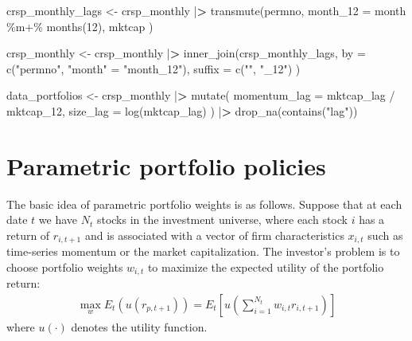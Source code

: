 \documentclass[
]{krantz}
\newenvironment{Shaded}{\begin{snugshade}}{\end{snugshade}}
\newcommand{\AttributeTok}[1]{\textcolor[rgb]{0.61,0.61,0.61}{#1}}
\newcommand{\DecValTok}[1]{\textcolor[rgb]{0.06,0.06,0.06}{#1}}
\newcommand{\ErrorTok}[1]{\textcolor[rgb]{0.14,0.14,0.14}{\textbf{#1}}}
\newcommand{\FunctionTok}[1]{\textcolor[rgb]{0,0,0}{#1}}
\newcommand{\NormalTok}[1]{#1}
\newcommand{\OtherTok}[1]{\textcolor[rgb]{0.37,0.37,0.37}{#1}}
\newcommand{\SpecialCharTok}[1]{\textcolor[rgb]{0,0,0}{#1}}
\newcommand{\StringTok}[1]{\textcolor[rgb]{0.5,0.5,0.5}{#1}}
\begin{document}
\begin{Shaded}
\begin{Highlighting}[]
\NormalTok{crsp\_monthly\_lags }\OtherTok{\textless{}{-}}\NormalTok{ crsp\_monthly }\SpecialCharTok{|}\ErrorTok{\textgreater{}}
  \FunctionTok{transmute}\NormalTok{(permno,}
    \AttributeTok{month\_12 =}\NormalTok{ month }\SpecialCharTok{\%m+\%} \FunctionTok{months}\NormalTok{(}\DecValTok{12}\NormalTok{),}
\NormalTok{    mktcap}
\NormalTok{  )}

\NormalTok{crsp\_monthly }\OtherTok{\textless{}{-}}\NormalTok{ crsp\_monthly }\SpecialCharTok{|}\ErrorTok{\textgreater{}}
  \FunctionTok{inner\_join}\NormalTok{(crsp\_monthly\_lags,}
    \AttributeTok{by =} \FunctionTok{c}\NormalTok{(}\StringTok{"permno"}\NormalTok{, }\StringTok{"month"} \OtherTok{=} \StringTok{"month\_12"}\NormalTok{),}
    \AttributeTok{suffix =} \FunctionTok{c}\NormalTok{(}\StringTok{""}\NormalTok{, }\StringTok{"\_12"}\NormalTok{)}
\NormalTok{  )}

\NormalTok{data\_portfolios }\OtherTok{\textless{}{-}}\NormalTok{ crsp\_monthly }\SpecialCharTok{|}\ErrorTok{\textgreater{}}
  \FunctionTok{mutate}\NormalTok{(}
    \AttributeTok{momentum\_lag =}\NormalTok{ mktcap\_lag }\SpecialCharTok{/}\NormalTok{ mktcap\_12,}
    \AttributeTok{size\_lag =} \FunctionTok{log}\NormalTok{(mktcap\_lag)}
\NormalTok{  ) }\SpecialCharTok{|}\ErrorTok{\textgreater{}}
  \FunctionTok{drop\_na}\NormalTok{(}\FunctionTok{contains}\NormalTok{(}\StringTok{"lag"}\NormalTok{))}
\end{Highlighting}
\end{Shaded}

\hypertarget{parametric-portfolio-policies-1}{%
\section{Parametric portfolio policies}\label{parametric-portfolio-policies-1}}

The basic idea of parametric portfolio weights is as follows. Suppose that at each date \(t\) we have \(N_t\) stocks in the investment universe, where each stock \(i\) has a return of \(r_{i, t+1}\) and is associated with a vector of firm characteristics \(x_{i, t}\) such as time-series momentum or the market capitalization. The investor's problem is to choose portfolio weights \(w_{i,t}\) to maximize the expected utility of the portfolio return:
\[\begin{aligned}
\max_{w} E_t\left(u(r_{p, t+1})\right) = E_t\left[u\left(\sum\limits_{i=1}^{N_t}w_{i,t}r_{i,t+1}\right)\right]
\end{aligned}\]
where \(u(\cdot)\) denotes the utility function.
\end{document}
